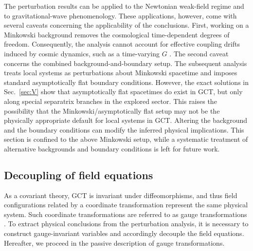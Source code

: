 \documentclass[aps,prd,twocolumn]{revtex4-2}
\begin{document}
The perturbation results can be applied to the Newtonian weak-field regime and to gravitational-wave phenomenology. These applications, however, come with several caveats concerning the applicability of the conclusions. First, working on a Minkowski background removes the cosmological time-dependent degrees of freedom. Consequently, the analysis cannot account for effective coupling drifts induced by cosmic dynamics, such as a time-varying $G$ \cite{Brans1961.PhysRev.124.925,Tian2019.PRD.99.064044}. The second caveat concerns the combined background-and-boundary setup. The subsequent analysis treats local systems as perturbations about Minkowski spacetime and imposes standard asymptotically flat boundary conditions. However, the exact solutions in Sec.~\ref{sec:V} show that asymptotically flat spacetimes do exist in GCT, but only along special separatrix branches in the explored sector. This raises the possibility that the Minkowski/asymptotically flat setup may not be the physically appropriate default for local systems in GCT. Altering the background and the boundary conditions can modify the inferred physical implications. This section is confined to the above Minkowski setup, while a systematic treatment of alternative backgrounds and boundary conditions is left for future work.

\subsection{Decoupling of field equations}
As a covariant theory, GCT is invariant under diffeomorphisms, and thus field configurations related by a coordinate transformation represent the same physical system. Such coordinate transformations are referred to as gauge transformations \cite{Flanagan2005.NewJPhys.7.204}. To extract physical conclusions from the perturbation analysis, it is necessary to construct gauge-invariant variables and accordingly decouple the field equations. Hereafter, we proceed in the passive description \cite{Mukhanov1992.PhysRep.215.203} of gauge transformations.
\end{document}

